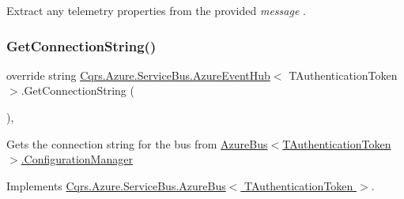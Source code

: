Extract any telemetry properties from the provided {\itshape message} . 

\mbox{\label{classCqrs_1_1Azure_1_1ServiceBus_1_1AzureEventHub_a9855633b53ed1f67863ef9dffad0812c_a9855633b53ed1f67863ef9dffad0812c}} 
\subsubsection{\texorpdfstring{Get\+Connection\+String()}{GetConnectionString()}}
{\footnotesize\ttfamily override string \hyperlink{classCqrs_1_1Azure_1_1ServiceBus_1_1AzureEventHub}{Cqrs.\+Azure.\+Service\+Bus.\+Azure\+Event\+Hub}$<$ T\+Authentication\+Token $>$.Get\+Connection\+String (\begin{DoxyParamCaption}{ }\end{DoxyParamCaption})\hspace{0.3cm}{\ttfamily [protected]}, {\ttfamily [virtual]}}



Gets the connection string for the bus from \hyperlink{classCqrs_1_1Azure_1_1ServiceBus_1_1AzureBus_aaf9469d220fb23cb0521fa76b25ab228_aaf9469d220fb23cb0521fa76b25ab228}{Azure\+Bus$<$\+T\+Authentication\+Token$>$.\+Configuration\+Manager} 



Implements \hyperlink{classCqrs_1_1Azure_1_1ServiceBus_1_1AzureBus_a514e371d5ce093678365af31e6c274e3_a514e371d5ce093678365af31e6c274e3}{Cqrs.\+Azure.\+Service\+Bus.\+Azure\+Bus$<$ T\+Authentication\+Token $>$}.

\mbox{\label{classCqrs_1_1Azure_1_1ServiceBus_1_1AzureEventHub_a3747fb9fcb3de2a72c8a6d7bbd92db95_a3747fb9fcb3de2a72c8a6d7bbd92db95}} 
